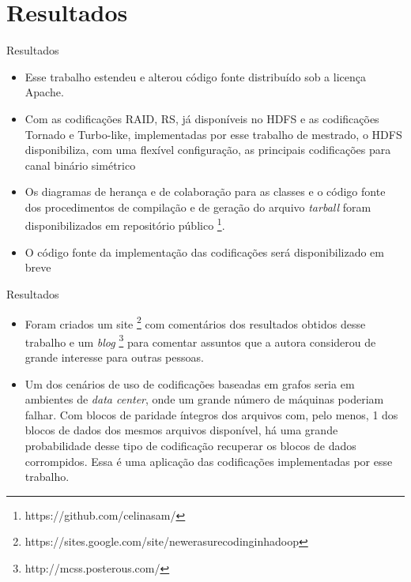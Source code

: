 \section{Resultados}

\begin{frame}{Resultados}

   \begin{itemize}

      \item<1-> Esse trabalho estendeu e alterou código fonte distribuído sob a licença Apache. 

      \item<2-> Com as codificações RAID, RS, já disponíveis no HDFS e as codificações Tornado e Turbo-like, implementadas por esse trabalho de mestrado, o HDFS disponibiliza, com uma flexível configuração, as principais codificações para canal binário simétrico

      \item<3-> Os diagramas de herança e de colaboração para as classes e o código fonte dos procedimentos de compilação e de geração do arquivo \emph{tarball} foram disponibilizados em repositório público \footnote{https://github.com/celinasam/}.
      \item<4-> O código fonte da implementação das codificações será disponibilizado em breve

  \end{itemize}

\end{frame}

\begin{frame}{Resultados}

   \begin{itemize}

      \item<1-> Foram criados um site \footnote{https://sites.google.com/site/newerasurecodinginhadoop} com comentários dos resultados obtidos desse trabalho e um \emph{blog} \footnote{http://mcss.posterous.com/} para comentar assuntos que a autora considerou de grande interesse para outras pessoas.

      \item<2-> Um dos cenários de uso de codificações baseadas em grafos seria em ambientes de \emph{data center}, onde um grande número de máquinas poderiam falhar. Com blocos de paridade íntegros dos arquivos com, pelo menos, 1 dos blocos de dados dos mesmos arquivos disponível, há uma grande probabilidade desse tipo de codificação recuperar os blocos de dados corrompidos. Essa é uma aplicação das codificações implementadas por esse trabalho.
  \end{itemize}

\end{frame}

